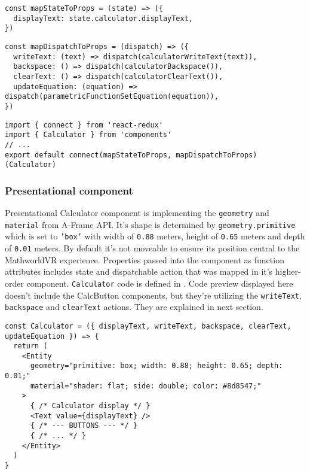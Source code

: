 \begin{lstlisting}[caption={Function to map \texttt{calculator} state to component properties.},captionpos=b]
const mapStateToProps = (state) => ({
  displayText: state.calculator.displayText,
})
\end{lstlisting}

\begin{lstlisting}[caption={Function to map dispatchable \texttt{calculator} action creators to component properties.},captionpos=b]
const mapDispatchToProps = (dispatch) => ({
  writeText: (text) => dispatch(calculatorWriteText(text)),
  backspace: () => dispatch(calculatorBackspace()),
  clearText: () => dispatch(calculatorClearText()),
  updateEquation: (equation) => dispatch(parametricFunctionSetEquation(equation)),
})
\end{lstlisting}

\begin{lstlisting}[caption={Creation of \texttt{Calculator} higher-order component.},captionpos=b]
import { connect } from 'react-redux'
import { Calculator } from 'components'
// ...
export default connect(mapStateToProps, mapDispatchToProps)(Calculator)
\end{lstlisting}

\subsubsection{Presentational component}
Presentational Calculator component is implementing the \texttt{geometry} and \texttt{material} from A-Frame API. It's shape is determined by \texttt{geometry.primitive} which is set to \texttt{'box'} with width of \texttt{0.88} meters, height of \texttt{0.65} meters and depth of \texttt{0.01} meters. By default it's not moveable to ensure its position central to the MathworldVR experience. Properties passed into the component as function attributes includes state and dispatchable action that was mapped in it's higher-order component. \texttt{Calculator} code is defined in . Code preview displayed here doesn't include the CalcButton components, but they're utilizing the \texttt{writeText}, \texttt{backspace} and \texttt{clearText} actions. They are explained in next section.

\begin{lstlisting}[caption={Presentational \textsl{Calculator} component code.},captionpos=b]
const Calculator = ({ displayText, writeText, backspace, clearText, updateEquation }) => {
  return (
    <Entity
      geometry="primitive: box; width: 0.88; height: 0.65; depth: 0.01;"
      material="shader: flat; side: double; color: #8d8547;"
    >
      { /* Calculator display */ }
      <Text value={displayText} />
      { /* --- BUTTONS --- */ }
      { /* ... */ }
    </Entity>
  )
}
      
\end{lstlisting}

